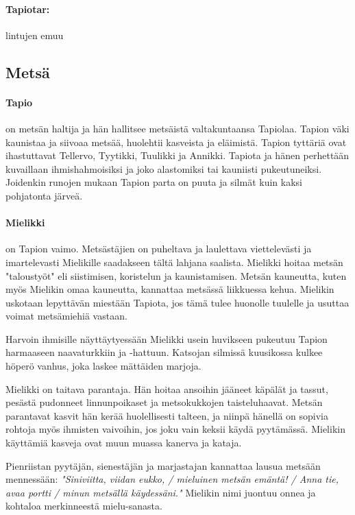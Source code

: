   \paragraph{Tapiotar:} lintujen emuu


\subsection{Metsä}

  \paragraph{Tapio} on metsän haltija ja hän hallitsee metsäistä valtakuntaansa Tapiolaa. Tapion
    väki kaunistaa ja siivoaa metsää, huolehtii kasveista ja eläimistä. Tapion tyttäriä ovat
    ihastuttavat Tellervo, Tyytikki, Tuulikki ja Annikki. Tapiota ja hänen perhettään kuvaillaan
    ihmishahmoisiksi ja joko alastomiksi tai kauniisti pukeutuneiksi. Joidenkin runojen mukaan
    Tapion parta on puuta ja silmät kuin kaksi pohjatonta järveä.
  \paragraph{Mielikki} on Tapion vaimo. Metsästäjien on puheltava ja laulettava viettelevästi ja
    imartelevasti Mielikille saadakseen tältä lahjana saalista. Mielikki hoitaa metsän "taloustyöt"
    eli siistimisen, koristelun ja kaunistamisen. Metsän kauneutta, kuten myös Mielikin omaa
    kauneutta, kannattaa metsässä liikkuessa kehua. Mielikin uskotaan lepyttävän miestään Tapiota,
    jos tämä tulee huonolle tuulelle ja usuttaa voimat metsämiehiä vastaan.
    \par
    Harvoin ihmisille näyttäytyessään Mielikki usein huvikseen pukeutuu Tapion harmaaseen
    naavaturkkiin ja -hattuun. Katsojan silmissä kuu\-sikossa kulkee höperö vanhus, joka laskee
    mättäiden marjoja.
    \par
    Mielikki on taitava parantaja. Hän hoitaa ansoihin jääneet käpälät ja tassut, pesästä pudonneet
    linnunpoikaset ja metsokukkojen taisteluhaavat. Metsän parantavat kasvit hän kerää
    huolellisesti talteen, ja niinpä hänellä on sopivia rohtoja myös ihmisten vaivoihin, jos joku
    vain keksii käydä pyytämässä. Mielikin käyttämiä kasveja ovat muun muassa kanerva ja kataja.
    \par
    Pienriistan pyytäjän, sienestäjän ja marjastajan kannattaa lausua metsään mennessään:
    \emph{"Siniviitta, viidan eukko, / mieluinen metsän e\-mäntä! / Anna tie, avaa portti / minun
    metsällä käydessäni."} Mielikin nimi juontuu onnea ja kohtaloa merkinneestä mielu-sanasta.
